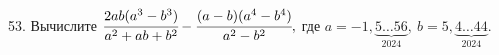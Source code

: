 53. Вычислите $\cfrac{2ab(a^3-b^3)}{a^2+ab+b^2}-\cfrac{(a-b)(a^4-b^4)}{a^2-b^2},$ где $a=-1,\underbrace{5\ldots56}_{2024},\ b=5,\underbrace{4\ldots44}_{2024}.$
\newpage
